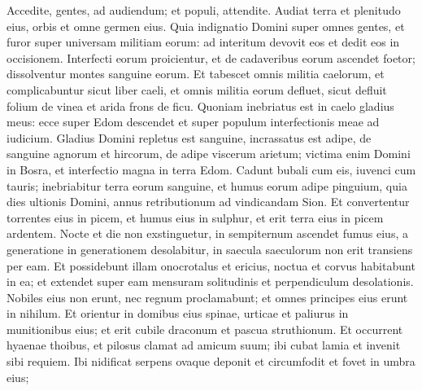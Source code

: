 \begin{biblechapter}
\begin{biblechapter}
\begin{biblechapter}
\begin{biblechapter}
\begin{biblechapter}
\begin{biblechapter}
\begin{biblechapter}
\begin{biblechapter}
\begin{biblechapter}
\begin{biblechapter}
\begin{biblechapter}
\begin{biblechapter}
\begin{biblechapter}
\begin{biblechapter}
\begin{biblechapter}
\begin{biblechapter}
\begin{biblechapter}
\begin{biblechapter}
\begin{biblechapter}
\begin{biblechapter}
\begin{biblechapter}
\begin{biblechapter}
\begin{biblechapter}
\begin{biblechapter}
\begin{biblechapter}
\begin{biblechapter}
\begin{biblechapter}
\begin{biblechapter}
\begin{biblechapter}
\begin{biblechapter}
\begin{biblechapter}
\begin{biblechapter}
\begin{biblechapter}
\begin{biblechapter}
\verse Accedite, gentes, ad audiendum;
 et populi, attendite.
 Audiat terra et plenitudo eius,
 orbis et omne germen eius.
 \verse Quia indignatio Domini super omnes gentes,
 et furor super universam militiam eorum:
 ad interitum devovit eos et dedit eos in occisionem.
 \verse Interfecti eorum proicientur,
 et de cadaveribus eorum ascendet foetor;
 dissolventur montes sanguine eorum.
 \verse Et tabescet omnis militia caelorum,
 et complicabuntur sicut liber caeli, et omnis militia eorum defluet,
 sicut defluit folium de vinea et arida frons de ficu.
 \verse Quoniam inebriatus est in caelo gladius meus:
 ecce super Edom descendet
 et super populum interfectionis meae ad iudicium.
 \verse Gladius Domini repletus est sanguine,
 incrassatus est adipe,
 de sanguine agnorum et hircorum, de adipe viscerum arietum;
 victima enim Domini in Bosra,
 et interfectio magna in terra Edom.
 \verse Cadunt bubali cum eis,
 iuvenci cum tauris;
 inebriabitur terra eorum sanguine,
 et humus eorum adipe pinguium,
 \verse quia dies ultionis Domini,
 annus retributionum ad vindicandam Sion.
 \verse Et convertentur torrentes eius in picem,
 et humus eius in sulphur,
 et erit terra eius in picem ardentem.
 \verse Nocte et die non exstinguetur,
 in sempiternum ascendet fumus eius,
 a generatione in generationem desolabitur,
 in saecula saeculorum non erit transiens per eam.
 \verse Et possidebunt illam onocrotalus et ericius,
 noctua et corvus habitabunt in ea;
 et extendet super eam mensuram solitudinis
 et perpendiculum desolationis.
 \verse Nobiles eius non erunt,
 nec regnum proclamabunt;
 et omnes principes eius erunt in nihilum.
 \verse Et orientur in domibus eius spinae,
 urticae et paliurus in munitionibus eius;
 et erit cubile draconum
 et pascua struthionum.
 \verse Et occurrent hyaenae thoibus,
 et pilosus clamat ad amicum suum;
 ibi cubat lamia
 et invenit sibi requiem.
 \verse Ibi nidificat serpens ovaque deponit
 et circumfodit et fovet in umbra eius;

\end{biblechapter}
\end{biblechapter}
\end{biblechapter}
\end{biblechapter}
\end{biblechapter}
\end{biblechapter}
\end{biblechapter}
\end{biblechapter}
\end{biblechapter}
\end{biblechapter}
\end{biblechapter}
\end{biblechapter}
\end{biblechapter}
\end{biblechapter}
\end{biblechapter}
\end{biblechapter}
\end{biblechapter}
\end{biblechapter}
\end{biblechapter}
\end{biblechapter}
\end{biblechapter}
\end{biblechapter}
\end{biblechapter}
\end{biblechapter}
\end{biblechapter}
\end{biblechapter}
\end{biblechapter}
\end{biblechapter}
\end{biblechapter}
\end{biblechapter}
\end{biblechapter}
\end{biblechapter}
\end{biblechapter}
\end{biblechapter}
